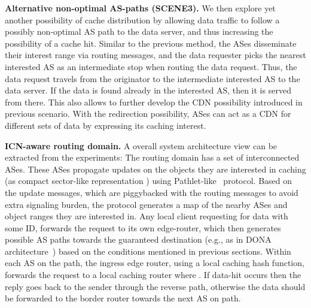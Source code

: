 \documentclass[article]{elsarticle}
\begin{document}
\textbf{Alternative non-optimal AS-paths (SCENE3).} We then explore yet another possibility of cache distribution by allowing data traffic to follow a possibly non-optimal AS path to the data server, and thus increasing the possibility of a cache hit. Similar to the previous method, the ASes disseminate their interest range via routing messages, and the data requester picks the nearest interested AS as an intermediate stop when routing the data request. Thus, the data request travels from the originator to the intermediate interested AS to the data server. If the data is found already in the interested AS, then it is served from there. This also allows to further develop the CDN possibility introduced in previous scenario. With the redirection possibility, ASes can act as a CDN for different sets of data by expressing its caching interest.

\textbf{ICN-aware routing domain.} A overall system architecture view can be extracted from the experiments: The routing domain has a set of interconnected ASes. These ASes propagate updates on the objects they are interested in caching (as compact sector-like representation ) using Pathlet-like~\cite{pathlet} protocol. Based on the update messages, which are piggybacked with the routing messages to avoid extra signaling burden, the protocol generates a map of the nearby ASes and object ranges they are interested in. Any local client requesting for data with some ID, forwards the request to its own edge-router, which then generates possible AS paths towards the guaranteed destination (e.g., as in DONA architecture~\cite{dona}) based on the conditions mentioned in previous sections.  Within each AS on the path, the ingress edge router, using a local caching hash function, forwards the request to a local caching router  where . If data-hit occurs then the reply goes back to the sender through the reverse path, otherwise the data should be forwarded to the border router towards the next AS on path.
\end{document}
